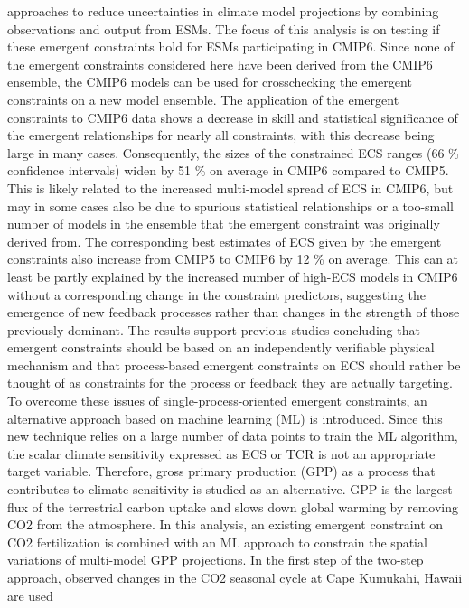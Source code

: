 {  approaches to reduce uncertainties in climate model projections by combining
  observations and output from ESMs. The focus of this analysis is on testing
  if these emergent constraints hold for ESMs participating in CMIP6. Since
  none of the emergent constraints considered here have been derived from the
  CMIP6 ensemble, the CMIP6 models can be used for crosschecking the emergent
  constraints on a new model ensemble. The application of the emergent
  constraints to CMIP6 data shows a decrease in skill and statistical
  significance of the emergent relationships for nearly all constraints, with
  this decrease being large in many cases. Consequently, the sizes of the
  constrained ECS ranges (66 \% confidence intervals) widen by 51 \% on average
  in CMIP6 compared to CMIP5. This is likely related to the increased
  multi-model spread of ECS in CMIP6, but may in some cases also be due to
  spurious statistical relationships or a too-small number of models in the
  ensemble that the emergent constraint was originally derived from. The
  corresponding best estimates of ECS given by the emergent constraints also
  increase from CMIP5 to CMIP6 by 12 \% on average. This can at least be partly
  explained by the increased number of high-ECS models in CMIP6 without a
  corresponding change in the constraint predictors, suggesting the emergence
  of new feedback processes rather than changes in the strength of those
  previously dominant. The results support previous studies concluding that
  emergent constraints should be based on an independently verifiable physical
  mechanism and that process-based emergent constraints on ECS should rather be
  thought of as constraints for the process or feedback they are actually
  targeting. To overcome these issues of single-process-oriented emergent
  constraints, an alternative approach based on machine learning (ML) is
  introduced. Since this new technique relies on a large number of data points
  to train the ML algorithm, the scalar climate sensitivity expressed as ECS or
  TCR is not an appropriate target variable. Therefore, gross primary
  production (GPP) as a process that contributes to climate sensitivity is
  studied as an alternative. GPP is the largest flux of the terrestrial carbon
  uptake and slows down global warming by removing CO2 from the atmosphere. In
  this analysis, an existing emergent constraint on CO2 fertilization is
  combined with an ML approach to constrain the spatial variations of
  multi-model GPP projections. In the first step of the two-step approach,
  observed changes in the CO2 seasonal cycle at Cape Kumukahi, Hawaii are used
}
